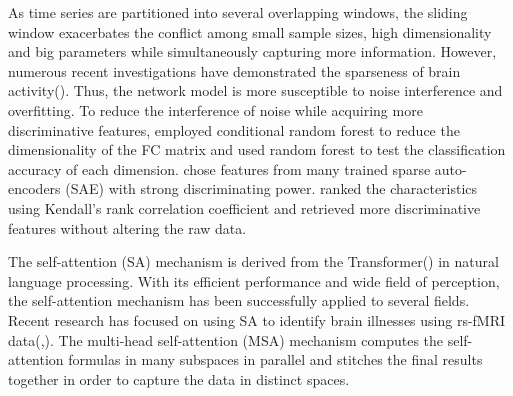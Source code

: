 \documentclass[a4paper]{cas-dc}
\begin{document}
As time series are partitioned into several overlapping windows, the sliding window exacerbates the conflict among small sample sizes, high dimensionality and big parameters while simultaneously capturing more information. However, numerous recent investigations have demonstrated the sparseness of brain activity(\cite{ju2017early}). Thus, the network model is more susceptible to noise interference and overfitting. To reduce the interference of noise while acquiring more discriminative features, \cite{fredo2018diagnostic} employed conditional random forest to reduce the dimensionality of the FC matrix and used random forest to test the classification accuracy of each dimension. \cite{guo2017diagnosing} chose features from many trained sparse auto-encoders (SAE) with strong discriminating power. \cite{liang2021convolutional} ranked the characteristics using Kendall's rank correlation coefficient and retrieved more discriminative features without altering the raw data.

The self-attention (SA) mechanism is derived from the Transformer(\cite{vaswani2017attention}) in natural language processing. With its efficient performance and wide field of perception, the self-attention mechanism has been successfully applied to several fields. Recent research has focused on using SA to identify brain illnesses using rs-fMRI data(\cite{kim2022interpretable},\cite{zhang2022self}). The multi-head self-attention (MSA) mechanism computes the self-attention formulas in many subspaces in parallel and stitches the final results together in order to capture the data in distinct spaces.

\end{document}
